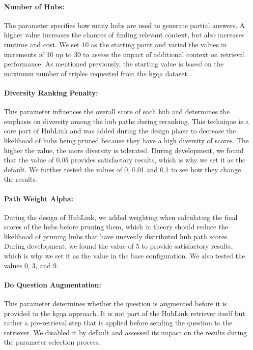 \paragraph{Number of Hubs:} The parameter specifies how many hubs are used to generate partial answers. A higher value increases the chances of finding relevant context, but also increases runtime and cost. We set 10 as the starting point and varied the values in increments of 10 up to 30 to assess the impact of additional context on retrieval performance. As mentioned previously, the starting value is based on the maximum number of triples requested from the \gls{kgqa} dataset.

\paragraph{Diversity Ranking Penalty:} This parameter influences the overall score of each hub and determines the emphasis on diversity among the hub paths during reranking. This technique is a core part of HubLink and was added during the design phase to decrease the likelihood of hubs being pruned because they have a high diversity of scores. The higher the value, the more diversity is tolerated. During development, we found that the value of 0.05 provides satisfactory results, which is why we set it as the default. We further tested the values of 0, 0.01 and 0.1 to see how they change the results.

\paragraph{Path Weight Alpha:} During the design of HubLink, we added weighting when calculating the final scores of the hubs before pruning them, which in theory should reduce the likelihood of pruning hubs that have unevenly distributed hub path scores. During development, we found the value of 5 to provide satisfactory results, which is why we set it as the value in the base configuration. We also tested the values 0, 3, and 9.

\paragraph{Do Question Augmentation:} This parameter determines whether the question is augmented before it is provided to the \gls{kgqa} approach. It is not part of the HubLink retriever itself but rather a pre-retrieval step that is applied before sending the question to the retriever. We disabled it by default and assessed its impact on the results during the parameter selection process.

